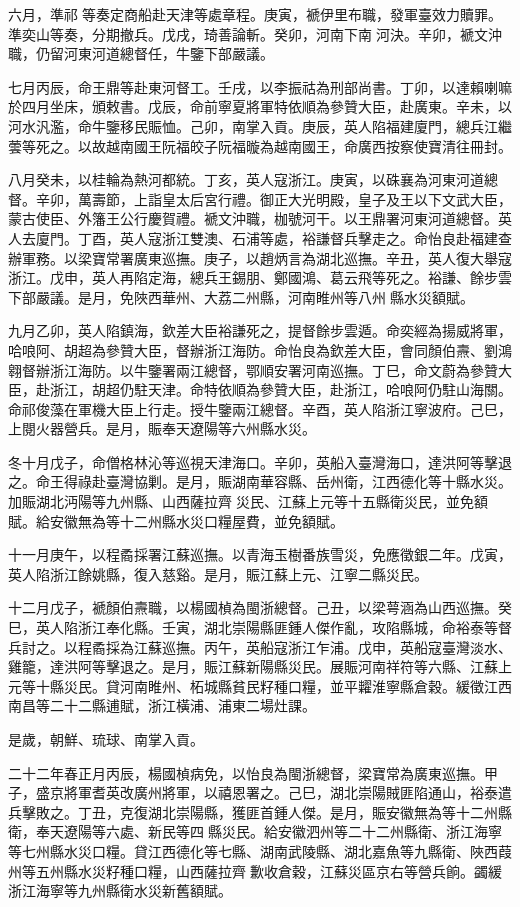 \begin{pinyinscope}
六月，準祁等奏定商船赴天津等處章程。庚寅，褫伊里布職，發軍臺效力贖罪。準奕山等奏，分期撤兵。戊戌，琦善論斬。癸卯，河南下南河決。辛卯，褫文沖職，仍留河東河道總督任，牛鑒下部嚴議。

七月丙辰，命王鼎等赴東河督工。壬戌，以李振祜為刑部尚書。丁卯，以達賴喇嘛於四月坐床，頒敕書。戊辰，命前寧夏將軍特依順為參贊大臣，赴廣東。辛未，以河水汎濫，命牛鑒移民賑恤。己卯，南掌入貢。庚辰，英人陷福建廈門，總兵江繼蕓等死之。以故越南國王阮福皎子阮福暶為越南國王，命廣西按察使寶清往冊封。

八月癸未，以桂輪為熱河都統。丁亥，英人寇浙江。庚寅，以硃襄為河東河道總督。辛卯，萬壽節，上詣皇太后宮行禮。御正大光明殿，皇子及王以下文武大臣，蒙古使臣、外籓王公行慶賀禮。褫文沖職，枷號河干。以王鼎署河東河道總督。英人去廈門。丁酉，英人寇浙江雙澳、石浦等處，裕謙督兵擊走之。命怡良赴福建查辦軍務。以梁寶常署廣東巡撫。庚子，以趙炳言為湖北巡撫。辛丑，英人復大舉寇浙江。戊申，英人再陷定海，總兵王錫朋、鄭國鴻、葛云飛等死之。裕謙、餘步雲下部嚴議。是月，免陜西華州、大荔二州縣，河南睢州等八州縣水災額賦。

九月乙卯，英人陷鎮海，欽差大臣裕謙死之，提督餘步雲遁。命奕經為揚威將軍，哈哴阿、胡超為參贊大臣，督辦浙江海防。命怡良為欽差大臣，會同顏伯燾、劉鴻翱督辦浙江海防。以牛鑒署兩江總督，鄂順安署河南巡撫。丁巳，命文蔚為參贊大臣，赴浙江，胡超仍駐天津。命特依順為參贊大臣，赴浙江，哈哴阿仍駐山海關。命祁俊藻在軍機大臣上行走。授牛鑒兩江總督。辛酉，英人陷浙江寧波府。己巳，上閱火器營兵。是月，賑奉天遼陽等六州縣水災。

冬十月戊子，命僧格林沁等巡視天津海口。辛卯，英船入臺灣海口，達洪阿等擊退之。命王得祿赴臺灣協剿。是月，賑湖南華容縣、岳州衛，江西德化等十縣水災。加賑湖北沔陽等九州縣、山西薩拉齊災民、江蘇上元等十五縣衛災民，並免額賦。給安徽無為等十二州縣水災口糧屋費，並免額賦。

十一月庚午，以程矞採署江蘇巡撫。以青海玉樹番族雪災，免應徵銀二年。戊寅，英人陷浙江餘姚縣，復入慈谿。是月，賑江蘇上元、江寧二縣災民。

十二月戊子，褫顏伯燾職，以楊國楨為閩浙總督。己丑，以梁萼涵為山西巡撫。癸巳，英人陷浙江奉化縣。壬寅，湖北崇陽縣匪鍾人傑作亂，攻陷縣城，命裕泰等督兵討之。以程矞採為江蘇巡撫。丙午，英船寇浙江乍浦。戊申，英船寇臺灣淡水、雞籠，達洪阿等擊退之。是月，賑江蘇新陽縣災民。展賑河南祥符等六縣、江蘇上元等十縣災民。貸河南睢州、柘城縣貧民籽種口糧，並平糶淮寧縣倉穀。緩徵江西南昌等二十二縣逋賦，浙江橫浦、浦東二場灶課。

是歲，朝鮮、琉球、南掌入貢。

二十二年春正月丙辰，楊國楨病免，以怡良為閩浙總督，梁寶常為廣東巡撫。甲子，盛京將軍耆英改廣州將軍，以禧恩署之。己巳，湖北崇陽賊匪陷通山，裕泰遣兵擊敗之。丁丑，克復湖北崇陽縣，獲匪首鍾人傑。是月，賑安徽無為等十二州縣衛，奉天遼陽等六處、新民等四縣災民。給安徽泗州等二十二州縣衛、浙江海寧等七州縣水災口糧。貸江西德化等七縣、湖南武陵縣、湖北嘉魚等九縣衛、陜西葭州等五州縣水災籽種口糧，山西薩拉齊歉收倉穀，江蘇災區京右等營兵餉。蠲緩浙江海寧等九州縣衛水災新舊額賦。


\end{pinyinscope}

